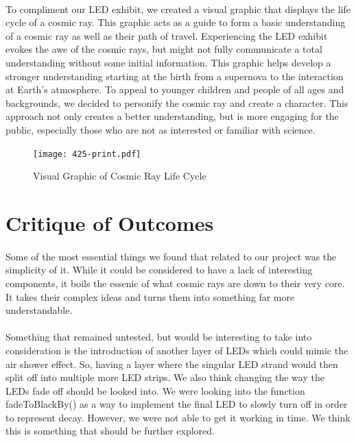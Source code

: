 \documentclass{article}
\begin{document}
\paragraph{}To compliment our LED exhibit, we created a visual graphic that displays the life cycle of a cosmic ray. This graphic acts as a guide to form a basic understanding of a cosmic ray as well as their path of travel. Experiencing the LED exhibit evokes the awe of the cosmic rays, but might not fully communicate a total understanding without some initial information. This graphic helps develop a stronger understanding starting at the birth from a supernova to the interaction at Earth’s atmosphere. To appeal to younger children and people of all ages and backgrounds, we decided to personify the cosmic ray and create a character. This approach not only creates a better understanding, but is more engaging for the public, especially those who are not as interested or familiar with science.
\begin{figure}
    \centering
    \texttt{[image: 425-print.pdf]}
    \caption{Visual Graphic of Cosmic Ray Life Cycle}
\end{figure}


\section{Critique of Outcomes}
\paragraph{}Some of the most essential things we found that related to our project was the simplicity of it. While it could be considered to have a lack of interesting components, it boils the essenic of what cosmic rays are down to their very core. It takes their complex ideas and turns them into something far more understandable. 
\paragraph{}Something that remained untested, but would be interesting to take into consideration is the introduction of another layer of LEDs which could mimic the air shower effect. So, having a layer where the singular LED strand would then split off into multiple more LED strips. We also think changing the way the LEDs fade off should be looked into. We were looking into the function fadeToBlackBy() as a way to implement the final LED to slowly turn off in order to represent decay. However, we were not able to get it working in time. We think this is something that should be further explored. 
\end{document}
